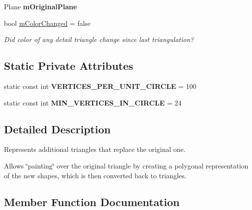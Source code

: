 \begin{DoxyCompactItemize}
\mbox{\label{classpepr3d_1_1_triangle_detail_a1f21de29cd698369a8a8bf9f357cdcb2}} 
Plane {\bfseries m\+Original\+Plane}
\item 
\mbox{\label{classpepr3d_1_1_triangle_detail_af49e18248a04af06f958001518b73db0}} 
bool \mbox{\hyperlink{classpepr3d_1_1_triangle_detail_af49e18248a04af06f958001518b73db0}{m\+Color\+Changed}} = false
\begin{DoxyCompactList}\small\item\em Did color of any detail triangle change since last triangulation? \end{DoxyCompactList}\end{DoxyCompactItemize}
\subsection*{Static Private Attributes}
\begin{DoxyCompactItemize}
\item 
\mbox{\label{classpepr3d_1_1_triangle_detail_af3b751ca10e1e87e63d49d58f1e6d142}} 
static const int {\bfseries V\+E\+R\+T\+I\+C\+E\+S\+\_\+\+P\+E\+R\+\_\+\+U\+N\+I\+T\+\_\+\+C\+I\+R\+C\+LE} = 100
\item 
\mbox{\label{classpepr3d_1_1_triangle_detail_ac9259653e0e58901b931ef725df2eb49}} 
static const int {\bfseries M\+I\+N\+\_\+\+V\+E\+R\+T\+I\+C\+E\+S\+\_\+\+I\+N\+\_\+\+C\+I\+R\+C\+LE} = 24
\end{DoxyCompactItemize}


\subsection{Detailed Description}
Represents additional triangles that replace the original one. 

Allows \char`\"{}painting\char`\"{} over the original triangle by creating a polygonal representation of the new shapes, which is then converted back to triangles. 

\subsection{Member Function Documentation}
\mbox{\label{classpepr3d_1_1_triangle_detail_a9d193b7c01d33c650b58738aed37e0e6}} 
